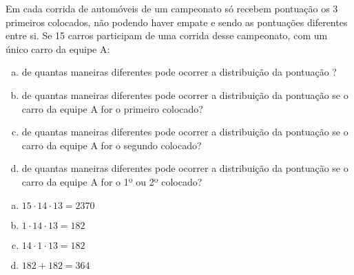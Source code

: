 \begin{ex}
Em cada corrida de automóveis de um campeonato só recebem pontuação os 3 primeiros colocados, não podendo haver empate e sendo as pontuações diferentes entre si. Se 15 carros participam de uma corrida desse campeonato, com um único carro da equipe A:
   \begin{enumerate}[(a)]
   \item de quantas maneiras diferentes pode ocorrer a distribuição da pontuação ?
   \item de quantas maneiras diferentes pode ocorrer a distribuição da pontuação se o carro da equipe A for o primeiro colocado?
   \item de quantas maneiras diferentes pode ocorrer a distribuição da pontuação se o carro da equipe A for o segundo colocado?
   \item de quantas maneiras diferentes pode ocorrer a distribuição da pontuação se o carro da equipe A for o 1º ou 2º colocado?
   \end{enumerate}
    \begin{sol}
     \phantom{A}
     \begin{enumerate} [(a)]
         \item $15\cdot14\cdot13=2370$
         \item $1\cdot14\cdot13=182$
         \item $14\cdot1\cdot13=182$
         \item $182+182=364$
     \end{enumerate}
    \end{sol}
\end{ex}